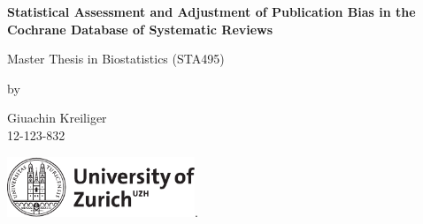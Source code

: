 \renewcommand\familydefault{\sfdefault} 



\thispagestyle{empty}
\renewcommand{\baselinestretch}{1.5}\normalfont
\begin{center}

\setlength{\parindent}{0cm}
\LARGE

\textbf{Statistical Assessment and Adjustment of Publication Bias in the Cochrane Database of Systematic Reviews}
\normalfont
{} 

\hrulefill

\vspace*{4cm}

\Large
Master Thesis in Biostatistics (STA495) %
\vspace*{12mm}

\large
by

\vspace*{12mm}

Giuachin Kreiliger\\
\normalsize 12-123-832\\
\normalfont

\vspace*{4cm}

\large
{}

\vspace*{1cm}


\vspace{1.8cm}

\includegraphics[height=1.8cm]{uzh_logo_e_pos}.

\vfill

\end{center}
\renewcommand\familydefault{\rmdefault}%
\renewcommand{\baselinestretch}{1.0}\rm 
\setcounter{page}{0}
\newpage
\vspace*{12cm}~\thispagestyle{empty}
\newpage
